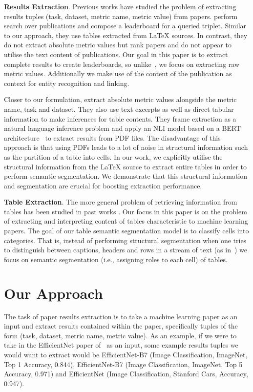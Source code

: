 \documentclass[11pt,a4paper]{article}
\begin{document}
\textbf{Results Extraction}. Previous works have studied the problem of extracting results tuples (task, dataset, metric name, metric value) from papers. \citet{ranking} perform search over publications and compose a leaderboard for a queried triplet. Similar to our approach, they use tables extracted from \LaTeX{} sources. In contrast, they do not extract absolute metric values but rank papers and do not appear to utilise the text content of publications. Our goal in this paper is to extract complete results to create leaderboards, so unlike~\citet{ranking}, we focus on extracting raw metric values. Additionally we make use of the content of the publication as context for entity recognition and linking.

Closer to our formulation, \citet{ibm-extraction} extract absolute metric values alongside the metric name, task and dataset. They also use text excerpts as well as direct tabular information to make inferences for table contents.
They frame extraction as a natural language inference problem and apply an NLI model based on a BERT architecture~\citep{bert} to extract results from PDF files. The disadvantage of this approach is that using PDFs leads to a lot of noise in structural information such as the partition of a table into cells. In our work, we explicitly utilise the structural information from the \LaTeX{} source to extract entire tables in order to perform semantic segmentation. We demonstrate that this structural information and segmentation are crucial for boosting extraction performance.



\textbf{Table Extraction}. The more general problem of retrieving information from tables has been studied in past works \citep{bio-tables,tabvec,ascii-tables,tapas}. Our focus in this paper is on the problem of extracting and interpreting content of tables characteristic to machine learning papers. The goal of our table semantic segmentation model is to classify cells into categories. That is, instead of performing structural segmentation when one tries to distinguish between captions, headers and rows in a stream of text (as in~\citep{crf-tables2}) we focus on semantic segmentation (i.e., assigning roles to each cell) of tables.

  \section{Our Approach}


The task of paper results extraction is to take a machine learning paper as an input and extract results contained within the paper, specifically tuples of the form (task, dataset, metric name, metric value). As an example, if we were to take in the EfficientNet paper of~\citet{efficientnet} as an input, some example results tuples we would want to extract would be EfficientNet-B7 (Image Classification, ImageNet, Top 1 Accuracy, 0.844), EfficientNet-B7 (Image Classification, ImageNet, Top 5 Accuracy, 0.971) and EfficientNet (Image Classification, Stanford Cars, Accuracy, 0.947).
\end{document}
